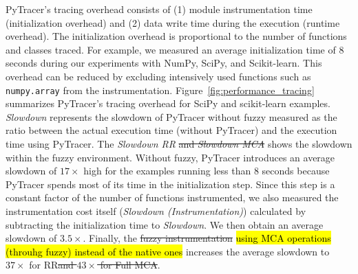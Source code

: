 \documentclass[10pt,journal,compsoc]{IEEEtran}
\newcommand{\pytracer}[0]{PyTracer\xspace}
\DeclareRobustCommand{\add}[1]{\sethlcolor{lightgreen}\hl{#1}}
\DeclareRobustCommand{\remove}[1]{\textcolor{lightred}{\sout{#1}}}
\begin{document}
\pytracer's tracing overhead consists of (1) module instrumentation time
(initialization overhead) and (2) data write time during the execution (runtime
overhead). The initialization overhead is proportional to the number of
functions and classes traced. For example, we measured an average initialization
time of 8 seconds during our experiments with  NumPy, SciPy, and Scikit-learn.
This overhead can be reduced by excluding intensively used functions such as
\texttt{numpy.array} from the instrumentation.
Figure~\ref{fig:performance_tracing} summarizes \pytracer's tracing overhead for
SciPy and scikit-learn examples. \textit{Slowdown} represents the slowdown of
\pytracer without fuzzy measured as the ratio between the actual execution time
(without \pytracer) and the execution time using \pytracer. The \textit{Slowdown
    RR} \remove{and \textit{Slowdown MCA}} shows the slowdown within the fuzzy environment.
Without fuzzy, \pytracer introduces an average slowdown of $17\times$ high for
the examples running less than 8 seconds because \pytracer spends most of its
time in the initialization step. Since this step is a constant factor of the
number of functions instrumented, we also measured the instrumentation cost
itself (\textit{Slowdown (Instrumentation)}) calculated by subtracting the
initialization time to \textit{Slowdown}. We then obtain an average slowdown of
$3.5\times$. Finally, the \remove{fuzzy instrumentation} \add{using MCA
    operations (throuhg fuzzy) instead of the native ones} increases the average
slowdown to $37\times$ for RR\remove{and $43\times$ for Full MCA}.

\end{document}
